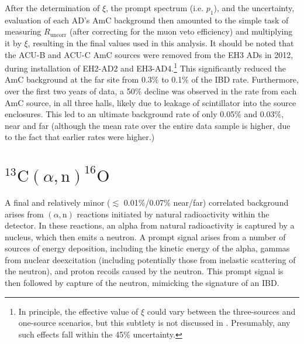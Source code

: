 \documentclass[../thesis.tex]{subfiles}
\begin{document}
After the determination of $\xi$, the prompt spectrum (i.e. $p_1$), and the uncertainty, evaluation of each AD's AmC background then amounted to the simple task of measuring $R_{\mathrm{uncorr}}$ (after correcting for the muon veto efficiency) and multiplying it by $\xi$, resulting in the final values used in this analysis. It should be noted that the ACU-B and ACU-C AmC sources were removed from the EH3 ADs in 2012, during installation of EH2-AD2 and EH3-AD4.\footnote{In principle, the effective value of $\xi$ could vary between the three-sources and one-source scenarios, but this subtlety is not discussed in \cite{Gu_2016}. Presumably, any such effects fall within the 45\% uncertainty.} This significantly reduced the AmC background at the far site from 0.3\% to 0.1\% of the IBD rate. Furthermore, over the first two years of data, a 50\% decline was observed in the rate from each AmC source, in all three halls, likely due to leakage of scintillator into the source enclosures. This led to an ultimate background rate of only 0.05\% and 0.03\%, near and far (although the mean rate over the entire data sample is higher, due to the fact that earlier rates were higher.)

\newcommand\alphN{(\alpha,\mathrm{n})}
\newcommand\CanO{^{13}\mathrm{C}(\alpha, \mathrm{n})^{16}\mathrm{O}}

\section{$\CanO$}

A final and relatively minor ($\lesssim$ 0.01\%/0.07\% near/far) correlated background arises from $\alphN$ reactions initiated by natural radioactivity within the detector. In these reactions, an alpha from natural radioactivity is captured by a nucleus, which then emits a neutron. A prompt signal arises from a number of sources of energy deposition, including the kinetic energy of the alpha, gammas from nuclear deexcitation (including potentially those from inelastic scattering of the neutron), and proton recoils caused by the neutron. This prompt signal is then followed by capture of the neutron, mimicking the signature of an IBD.
\end{document}
